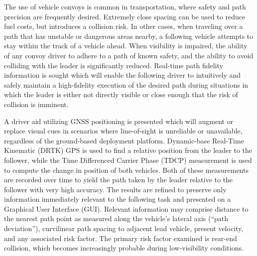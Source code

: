 The use of vehicle convoys is common in transportation, where safety and path precision are frequently desired. Extremely close spacing can be used to reduce fuel costs, but introduces a collision risk. In other cases, when traveling over a path that has unstable or dangerous areas nearby, a following vehicle attempts to stay within the track of a vehicle ahead. When visibility is impaired, the ability of any convoy driver to adhere to a path of known safety, and the ability to avoid colliding with the leader is significantly reduced. Real-time path fidelity information is sought which will enable the following driver to intuitively and safely maintain a high-fidelity execution of the desired path during situations in which the leader is either not directly visible or close enough that the risk of collision is imminent.

A driver aid utilizing GNSS positioning is presented which will augment or replace visual cues in scenarios where line-of-sight is unreliable or unavailable, regardless of the ground-based deployment platform. Dynamic-base Real-Time Kinematic (DRTK) GPS is used to find a relative position from the leader to the follower, while the Time Differenced Carrier Phase (TDCP) measurement is used to compute the change in position of both vehicles. Both of these measurements are recorded over time to yield the path taken by the leader relative to the follower with very high accuracy. The results are refined to preserve only information immediately relevant to the following task and presented on a Graphical User Interface (GUI). Relevant information may comprise distance to the nearest path point as measured along the vehicle's lateral axis (“path deviation”), curvilinear path spacing to adjacent lead vehicle, present velocity, and any associated risk factor. The primary risk factor examined is rear-end collision, which becomes increasingly probable during low-visibility conditions.

